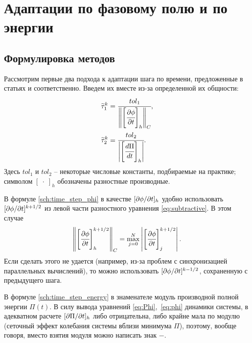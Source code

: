 
\section{Адаптации по фазовому полю и по энергии}

\subsection{Формулировка методов}

Рассмотрим первые два подхода к адаптации шага по времени, предложенные в статьях \cite{li_time_step} и \cite{zhang_time_step} соответственно. Введем их вместе из-за определенной их общности:
\begin{align}
	\widetilde{\tau}_1^k & = \cfrac{tol_1}{\left\| \left[ \cfrac{\partial \phi}{\partial t} \right]_h \right\|_C},
	\label{sch:time_step_phi} \\
	\widetilde{\tau}_2^k & = \cfrac{tol_2}{\left| \left[ \cfrac{d \Pi}{dt} \right]_h \right|}.
	\label{sch:time_step_energy}
\end{align}
Здесь $tol_1$ и $tol_2$ -- некоторые числовые константы, подбираемые на практике; символом $[\; \cdot \;]_h$ обозначены разностные производные.

В формуле \eqref{sch:time_step_phi} в качестве $[\partial \phi / \partial t]_h$ удобно использовать $[\partial \phi / \partial t]^{k + 1/2}$ из левой части разностного уравнения \eqref{eq:subtractive}. В этом случае
\[
	\left\| \left[ \cfrac{\partial \phi}{\partial t} \right]_h^{k + 1/2} \right\|_C = \max\limits_{j = 0}^N \left| \left[ \cfrac{\partial \phi}{\partial t} \right]_j^{k + 1/2} \right|.
\]
Если сделать этого не удается (например, из-за проблем с синхронизацией параллельных вычислений), то можно использовать $[\partial \phi / \partial t]^{k - 1/2}$, сохраненную с предыдущего шага.

В формуле \eqref{sch:time_step_energy} в знаменателе модуль производной полной энергии $\Pi(t)$. В силу вывода уравнений \eqref{eq:Phi},~\eqref{eq:phi} динамики системы, в адекватном расчете $[\partial \Pi / \partial t]_h$ либо отрицательна, либо крайне мала по модулю (сеточный эффект колебания системы вблизи минимума $\Pi$), поэтому, вообще говоря, вместо взятия модуля можно написать знак $-$.

